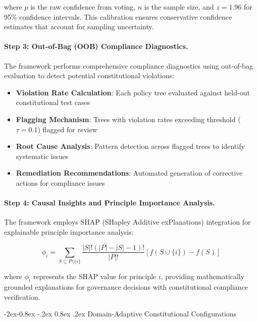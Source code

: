 \documentclass[manuscript,screen,9pt]{acmart}
\makeatletter
\renewcommand\subsubsection{\@startsection{subsubsection}{3}{\z@}%
  {-2ex\@plus -0.8ex \@minus -.2ex}%
  {0.8ex \@plus .2ex}%
  {\normalfont\normalsize\bfseries}}
\makeatother
\begin{document}
where $p$ is the raw confidence from voting, $n$ is the sample size, and $z = 1.96$ for 95\% confidence intervals. This calibration ensures conservative confidence estimates that account for sampling uncertainty.

\paragraph{Step 3: Out-of-Bag (OOB) Compliance Diagnostics.}
The framework performs comprehensive compliance diagnostics using out-of-bag evaluation to detect potential constitutional violations:

\begin{itemize}[itemsep=1pt,parsep=1pt]
    \item \textbf{Violation Rate Calculation}: Each policy tree evaluated against held-out constitutional test cases
    \item \textbf{Flagging Mechanism}: Trees with violation rates exceeding threshold ($\tau = 0.1$) flagged for review
    \item \textbf{Root Cause Analysis}: Pattern detection across flagged trees to identify systematic issues
    \item \textbf{Remediation Recommendations}: Automated generation of corrective actions for compliance issues
\end{itemize}

\paragraph{Step 4: Causal Insights and Principle Importance Analysis.}
The framework employs SHAP (SHapley Additive exPlanations) integration for explainable principle importance analysis:

\begin{equation}
\phi_i = \sum_{S \subseteq P \setminus \{i\}} \frac{|S|!(|P|-|S|-1)!}{|P|!} [f(S \cup \{i\}) - f(S)]
\end{equation}

where $\phi_i$ represents the SHAP value for principle $i$, providing mathematically grounded explanations for governance decisions with constitutional compliance verification.

\subsubsection{Domain-Adaptive Constitutional Configurations}
\label{subsubsec:domain_adaptive_configurations}
\end{document}
